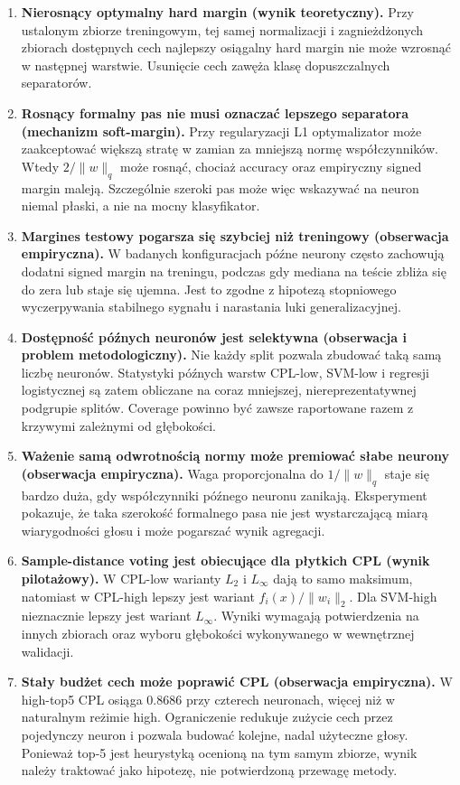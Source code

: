 \documentclass[11pt,a4paper]{article}
\begin{document}
\begin{enumerate}
\item \textbf{Nierosnący optymalny hard margin (wynik teoretyczny).}
Przy ustalonym zbiorze treningowym, tej samej normalizacji i zagnieżdżonych zbiorach dostępnych cech najlepszy
osiągalny hard margin nie może wzrosnąć w następnej warstwie. Usunięcie cech zawęża klasę dopuszczalnych
separatorów.

\item \textbf{Rosnący formalny pas nie musi oznaczać lepszego separatora (mechanizm soft-margin).}
Przy regularyzacji L1 optymalizator może zaakceptować większą stratę w zamian za mniejszą normę
współczynników. Wtedy $2/\lVert w\rVert_q$ może rosnąć, chociaż accuracy oraz empiryczny signed margin maleją.
Szczególnie szeroki pas może więc wskazywać na neuron niemal płaski, a nie na mocny klasyfikator.

\item \textbf{Margines testowy pogarsza się szybciej niż treningowy (obserwacja empiryczna).}
W badanych konfiguracjach późne neurony często zachowują dodatni signed margin na treningu, podczas gdy
mediana na teście zbliża się do zera lub staje się ujemna. Jest to zgodne z hipotezą stopniowego wyczerpywania
stabilnego sygnału i narastania luki generalizacyjnej.

\item \textbf{Dostępność późnych neuronów jest selektywna (obserwacja i problem metodologiczny).}
Nie każdy split pozwala zbudować taką samą liczbę neuronów. Statystyki późnych warstw CPL-low, SVM-low i
regresji logistycznej są zatem obliczane na coraz mniejszej, niereprezentatywnej podgrupie splitów. Coverage
powinno być zawsze raportowane razem z krzywymi zależnymi od głębokości.

\item \textbf{Ważenie samą odwrotnością normy może premiować słabe neurony (obserwacja empiryczna).}
Waga proporcjonalna do $1/\lVert w\rVert_q$ staje się bardzo duża, gdy współczynniki późnego neuronu zanikają.
Eksperyment pokazuje, że taka szerokość formalnego pasa nie jest wystarczającą miarą wiarygodności głosu i
może pogarszać wynik agregacji.

\item \textbf{Sample-distance voting jest obiecujące dla płytkich CPL (wynik pilotażowy).}
W CPL-low warianty $L_2$ i $L_\infty$ dają to samo maksimum, natomiast w CPL-high lepszy jest wariant
$f_i(x)/\lVert w_i\rVert_2$. Dla SVM-high nieznacznie lepszy jest wariant $L_\infty$. Wyniki wymagają
potwierdzenia na innych zbiorach oraz wyboru głębokości wykonywanego w wewnętrznej walidacji.

\item \textbf{Stały budżet cech może poprawić CPL (obserwacja empiryczna).}
W high-top5 CPL osiąga 0.8686 przy czterech neuronach, więcej niż w naturalnym reżimie high. Ograniczenie
redukuje zużycie cech przez pojedynczy neuron i pozwala budować kolejne, nadal użyteczne głosy. Ponieważ
top-5 jest heurystyką ocenioną na tym samym zbiorze, wynik należy traktować jako hipotezę, nie potwierdzoną
przewagę metody.
\end{enumerate}
\end{document}
